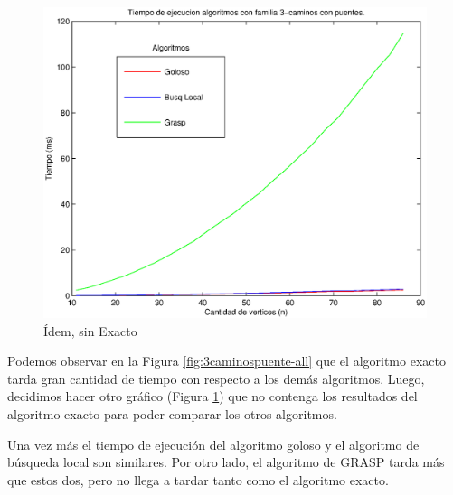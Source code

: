 \begin{figure}[H]
\begin{minipage}{0.5\linewidth}
      \includegraphics[width=\linewidth]{graficos/todos_tiempo_puentes_sinE.eps}
      \caption{Ídem, sin Exacto}\label{fig:3caminospuente-sinE}
    \end{minipage}    
\end{figure}

Podemos observar en la Figura \ref{fig:3caminospuente-all} que el algoritmo exacto tarda gran cantidad de tiempo con respecto a los demás algoritmos. Luego, decidimos hacer otro gráfico (Figura \ref{fig:3caminospuente-sinE}) que no contenga los resultados del algoritmo exacto para poder comparar los otros algoritmos.

Una vez más el tiempo de ejecución del algoritmo goloso y el algoritmo de búsqueda local son similares. Por otro lado, el algoritmo de GRASP tarda más que estos dos, pero no llega a tardar tanto como el algoritmo exacto.